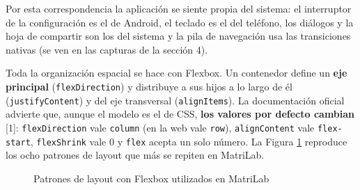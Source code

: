 Por esta correspondencia la aplicación se siente propia del sistema: el interruptor de la configuración es el de Android, el teclado es el del teléfono, los diálogos y la hoja de compartir son los del sistema y la pila de navegación usa las transiciones nativas (se ven en las capturas de la sección 4).

\vspace{0.2cm}

Toda la organización espacial se hace con Flexbox. Un contenedor define un \textbf{eje principal} (\texttt{flex\allowbreak{}Direction}) y distribuye a sus hijos a lo largo de él (\texttt{justify\allowbreak{}Content}) y del eje transversal (\texttt{align\allowbreak{}Items}). La documentación oficial advierte que, aunque el modelo es el de CSS, \textbf{los valores por defecto cambian} [1]: \texttt{flex\allowbreak{}Direction} vale \texttt{column} (en la web vale \texttt{row}), \texttt{align\allowbreak{}Content} vale \texttt{flex-start}, \texttt{flex\allowbreak{}Shrink} vale 0 y \texttt{flex} acepta un solo número. La Figura \ref{fig:flexbox} reproduce los ocho patrones de layout que más se repiten en MatriLab.

\begin{figure}[!htbp]
\centering
{}
\caption{Patrones de layout con Flexbox utilizados en MatriLab}
\label{fig:flexbox}
\end{figure}

